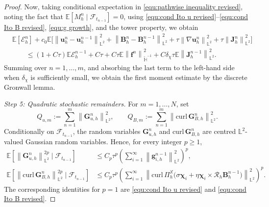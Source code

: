 \documentclass[10pt,a4paper]{amsart}
\newcommand{\bb}{\mathbb}
\newcommand{\bff}{\boldsymbol}
\newcommand{\curl}{\mathrm{curl}\,}
\newcommand{\norm}[2]{\left\|{#1}\right\|_{#2}}
\begin{document}
\begin{proof}
	
	Now, taking conditional expectation in \eqref{equ:pathwise inequality revised}, noting the fact that $\bb E[M_h^n\mid\mathscr F_{t_{n-1}}]=0$, using \eqref{equ:cond Ito u revised}--\eqref{equ:cond Ito B revised}, \eqref{equ:g growth}, and the tower property, we obtain
	\begin{align}\label{equ:first moment one step revised}
		&\bb E \left[\mathcal E_h^n\right]
		+
		c_0\bb E\Big[
		\norm{\bff u_h^n-\bff u_h^{n-1}}{\bb L^2}^2
		+
		\norm{\bff B_h^n-\bff B_h^{n-1}}{\bb L^2}^2
		+
		\tau\norm{\nabla\bff u_h^n}{\bb L^2}^2
		+
		\tau\norm{\bff J_h^n}{\bb L^2}^2
		\Big]
		\nonumber\\
		&\qquad
		\le
		(1+C\tau)\bb E\mathcal E_h^{n-1}
		+
		C\tau
		+
		C\tau\bb E\norm{\bff f^n}{\widetilde{\bb H}^{-1}}^2
		+
		C\delta_\chi\tau\bb E\norm{\bff J_h^{n-1}}{\bb L^2}^2.
	\end{align}
	Summing over $n=1,\ldots,m$, and absorbing the last term to the left-hand side when $\delta_\chi$ is sufficiently small, we obtain the first moment estimate by the discrete Gronwall lemma.
	
	
	\emph{Step 5: Quadratic stochastic remainders.}
	For $m=1,\ldots,N$, set
	\[
	Q_{u,m}
	:=
	\sum_{n=1}^{m}
	\norm{\bff G_{u,h}^n}{\bb L^2}^2,
	\qquad
	Q_{B,m}
	:=
	\sum_{n=1}^{m}
	\norm{\curl\bff G_{B,h}^n}{\bb L^2}^2.
	\]
	Conditionally on $\mathscr F_{t_{n-1}}$, the random variables
	$\bff G_{u,h}^n$ and $\curl\bff G_{B,h}^n$ are centred
	$\bb L^2$-valued Gaussian random variables. Hence, for every integer
	$p\ge1$,
	\begin{align}
		\label{equ:conditional Gaussian Gu}
		\bb E\left[
		\norm{\bff G_{u,h}^n}{\bb L^2}^{2p}
		\mid\mathscr F_{t_{n-1}}
		\right]
		&\le
		C_p\tau^p
		\left(
		\sum_{i=1}^{\infty}
		\norm{\bff g_{i,h}^{n-1}}{\bb L^2}^2
		\right)^p,
		\\
		\label{equ:conditional Gaussian GB}
		\bb E\left[
		\norm{\curl\bff G_{B,h}^n}{\bb L^2}^{2p}
		\mid\mathscr F_{t_{n-1}}
		\right]
		&\le
		C_p\tau^p
		\left(
		\sum_{i=1}^{\infty}
		\norm{
			\curl\Pi_h^{\bb X}
			\bigl(
			\sigma\bff\chi_i
			+
			\eta\bff\chi_i\times\mathcal R_h\bff B_h^{n-1}
			\bigr)}
		{\bb L^2}^2
		\right)^p.
	\end{align}
	The corresponding identities for $p=1$ are
	\eqref{equ:cond Ito u revised} and \eqref{equ:cond Ito B revised}.
	

\end{proof}
\end{document}
